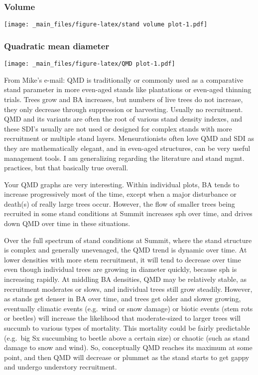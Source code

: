 \documentclass[
]{article}
\begin{document}
\hypertarget{volume}{%
\subsubsection{Volume}\label{volume}}

\texttt{[image: \_main\_files/figure-latex/stand volume plot-1.pdf]}

\hypertarget{quadratic-mean-diameter}{%
\subsubsection{Quadratic mean diameter}\label{quadratic-mean-diameter}}

\texttt{[image: \_main\_files/figure-latex/QMD plot-1.pdf]}

From Mike's e-mail:
QMD is traditionally or commonly used as a comparative stand parameter in more even-aged stands like plantations or even-aged thinning trials. Trees grow and BA increases, but numbers of live trees do not increase, they only decrease through suppression or harvesting. Usually no recruitment. QMD and its variants are often the root of various stand density indexes, and these SDI's usually are not used or designed for complex stands with more recruitment or multiple stand layers. Mensurationists often love QMD and SDI as they are mathematically elegant, and in even-aged structures, can be very useful management tools. I am generalizing regarding the literature and stand mgmt. practices, but that basically true overall.

Your QMD graphs are very interesting. Within individual plots, BA tends to increase progressively most of the time, except when a major disturbance or death(s) of really large trees occur. However, the flow of smaller trees being recruited in some stand conditions at Summit increases sph over time, and drives down QMD over time in these situations.

Over the full spectrum of stand conditions at Summit, where the stand structure is complex and generally unevenaged, the QMD trend is dynamic over time. At lower densities with more stem recruitment, it will tend to decrease over time even though individual trees are growing in diameter quickly, because sph is increasing rapidly. At middling BA densities, QMD may be relatively stable, as recruitment moderates or slows, and individual trees still grow steadily. However, as stands get denser in BA over time, and trees get older and slower growing, eventually climatic events (e.g.~wind or snow damage) or biotic events (stem rots or beetles) will increase the likelihood that moderate-sized to larger trees will succumb to various types of mortality. This mortality could be fairly predictable (e.g.~big Sx succumbing to beetle above a certain size) or chaotic (such as stand damage to snow and wind). So, conceptually QMD reaches its maximum at some point, and then QMD will decrease or plummet as the stand starts to get gappy and undergo understory recruitment.
\end{document}
